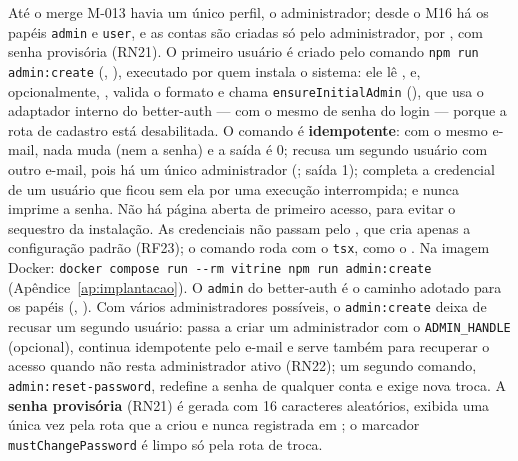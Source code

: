 Até o merge M-013 havia um único perfil, o administrador; desde o M16 há os papéis \texttt{admin} e \texttt{user}, e as contas são criadas só pelo administrador, por , com senha provisória (RN21). O primeiro usuário é criado pelo comando \texttt{npm run admin:create} (, ), executado por quem instala o sistema: ele lê ,  e, opcionalmente, , valida o formato e chama \texttt{ensureInitialAdmin} (), que usa o adaptador interno do better-auth --- com o mesmo  de senha do login --- porque a rota de cadastro está desabilitada. O comando é \textbf{idempotente}: com o mesmo e-mail, nada muda (nem a senha) e a saída é 0; recusa um segundo usuário com outro e-mail, pois há um único administrador (; saída 1); completa a credencial de um usuário que ficou sem ela por uma execução interrompida; e nunca imprime a senha. Não há página aberta de primeiro acesso, para evitar o sequestro da instalação. As credenciais não passam pelo , que cria apenas a configuração padrão (RF23); o comando roda com o \texttt{tsx}, como o . Na imagem Docker: \texttt{docker compose run -{}-rm vitrine npm run admin:create} (Apêndice~\ref{ap:implantacao}). O  \texttt{admin} do better-auth é o caminho adotado para os papéis (, ). Com vários administradores possíveis, o \texttt{admin:create} deixa de recusar um segundo usuário: passa a criar um administrador com o \texttt{ADMIN\_HANDLE} (opcional), continua idempotente pelo e-mail e serve também para recuperar o acesso quando não resta administrador ativo (RN22); um segundo comando, \texttt{admin:reset-password}, redefine a senha de qualquer conta e exige nova troca. A \textbf{senha provisória} (RN21) é gerada com 16 caracteres aleatórios, exibida uma única vez pela rota que a criou e nunca registrada em ; o marcador \texttt{mustChangePassword} é limpo só pela rota de troca.
